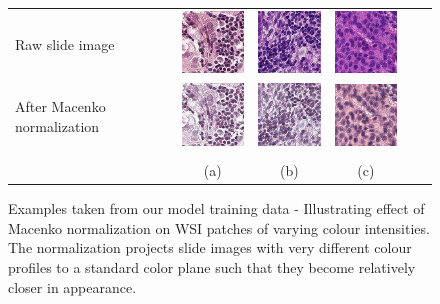 \documentclass{l4proj}
\begin{document}
\begin{figure}[H]
\centering
\begin{tabular}{lccccc}
Raw slide image&
\includegraphics[width=80px]{images/37.jpeg}&
\includegraphics[width=80px]{images/68.jpeg}&
\includegraphics[width=80px]{images/195.jpeg}\\
After Macenko normalization&
 \includegraphics[width=80px]{images/37_macenko.jpeg}&
 \includegraphics[width=80px]{images/68_macenko.jpeg}&
 \includegraphics[width=80px]{images/195_macenko.jpeg}\\
 \\&
 (a)&(b)&(c)\\
\end{tabular}
\caption{Examples taken from our model training data - Illustrating effect of Macenko normalization on WSI patches of varying colour intensities. The normalization projects slide images with very different colour profiles to a standard color plane such that they become relatively closer in appearance. }
\label{fig:macenko-example}
\end{figure}
\end{document}
